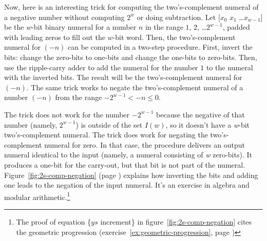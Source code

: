 Now, here is an interesting
trick
for computing the two's-complement numeral of a negative number without
computing $2^w$ or doing subtraction.
Let \textsf{[$x_0$ $x_1$ \dots $x_{w-1}$]}
be the $w$-bit binary numeral for a number $n$ in the range $1$, $2$, \dots $2^{w-1}$,
padded with leading zeros to fill out the $w$-bit word.
Then, the two's-complement numeral for $(-n)$ can be computed
in a two-step procedure.
First, invert the bits: change the zero-bits to one-bits
and change the one-bits to zero-bits.
Then, use the ripple-carry adder to add the numeral for the number $1$
to the numeral with the inverted bits.
The result will be the two's-complement numeral for $(-n)$.
The same trick works to negate the two's-complement numeral
of a number $(-n)$ from the range $-2^{w-1} < -n \leq 0$.

The trick does not work for the number $-2^{w-1}$
because the negative of that number (namely, $2^{w-1}$)
is outside of the set $I(w)$,
so it doesn't have a \emph{w}-bit two's-complement numeral.
The trick does work for negating the two's-complement numeral for zero.
In that case, the procedure delivers an output numeral identical
to the input (namely, a numeral consisting of \emph{w} zero-bits).
It produces a one-bit for the carry-out, but that bit is not part of the numeral.
Figure~\ref{fig:2s-comp-negation}
(page \pageref{fig:2s-comp-negation})
explains how inverting the bits and adding one leads to the negation
of the input numeral.
It's an exercise in algebra and modular arithmetic.\footnote{The
proof of equation \{$ys$ increment\}
in figure~\ref{fig:2s-comp-negation}
cites the geometric progression
(exercise~\ref{ex:geometric-progression}, page \pageref{ex:geometric-progression})}

